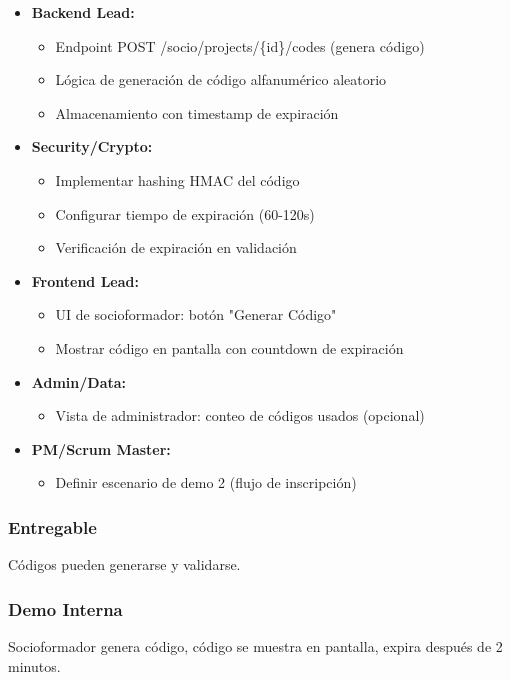 \documentclass[12pt,a4paper]{article}
\begin{document}
\begin{itemize}[leftmargin=*]
    \item \textbf{Backend Lead:}
    \begin{itemize}
        \item Endpoint POST /socio/projects/\{id\}/codes (genera código)
        \item Lógica de generación de código alfanumérico aleatorio
        \item Almacenamiento con timestamp de expiración
    \end{itemize}
    
    \item \textbf{Security/Crypto:}
    \begin{itemize}
        \item Implementar hashing HMAC del código
        \item Configurar tiempo de expiración (60-120s)
        \item Verificación de expiración en validación
    \end{itemize}
    
    \item \textbf{Frontend Lead:}
    \begin{itemize}
        \item UI de socioformador: botón "Generar Código"
        \item Mostrar código en pantalla con countdown de expiración
    \end{itemize}
    
    \item \textbf{Admin/Data:}
    \begin{itemize}
        \item Vista de administrador: conteo de códigos usados (opcional)
    \end{itemize}
    
    \item \textbf{PM/Scrum Master:}
    \begin{itemize}
        \item Definir escenario de demo 2 (flujo de inscripción)
    \end{itemize}
\end{itemize}

\subsubsection{Entregable}
Códigos pueden generarse y validarse.

\subsubsection{Demo Interna}
Socioformador genera código, código se muestra en pantalla, expira después de 2 minutos.
\end{document}
